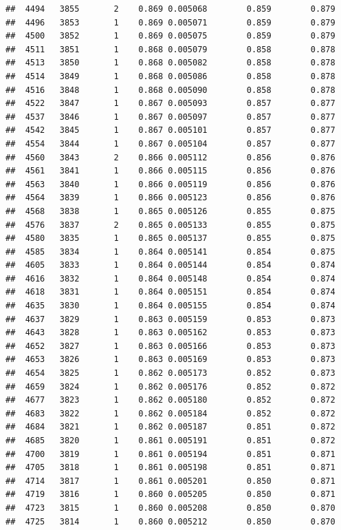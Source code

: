 \documentclass[
]{book}
\begin{document}
\begin{verbatim}
##  4494   3855       2    0.869 0.005068        0.859        0.879
##  4496   3853       1    0.869 0.005071        0.859        0.879
##  4500   3852       1    0.869 0.005075        0.859        0.879
##  4511   3851       1    0.868 0.005079        0.858        0.878
##  4513   3850       1    0.868 0.005082        0.858        0.878
##  4514   3849       1    0.868 0.005086        0.858        0.878
##  4516   3848       1    0.868 0.005090        0.858        0.878
##  4522   3847       1    0.867 0.005093        0.857        0.877
##  4537   3846       1    0.867 0.005097        0.857        0.877
##  4542   3845       1    0.867 0.005101        0.857        0.877
##  4554   3844       1    0.867 0.005104        0.857        0.877
##  4560   3843       2    0.866 0.005112        0.856        0.876
##  4561   3841       1    0.866 0.005115        0.856        0.876
##  4563   3840       1    0.866 0.005119        0.856        0.876
##  4564   3839       1    0.866 0.005123        0.856        0.876
##  4568   3838       1    0.865 0.005126        0.855        0.875
##  4576   3837       2    0.865 0.005133        0.855        0.875
##  4580   3835       1    0.865 0.005137        0.855        0.875
##  4585   3834       1    0.864 0.005141        0.854        0.875
##  4605   3833       1    0.864 0.005144        0.854        0.874
##  4616   3832       1    0.864 0.005148        0.854        0.874
##  4618   3831       1    0.864 0.005151        0.854        0.874
##  4635   3830       1    0.864 0.005155        0.854        0.874
##  4637   3829       1    0.863 0.005159        0.853        0.873
##  4643   3828       1    0.863 0.005162        0.853        0.873
##  4652   3827       1    0.863 0.005166        0.853        0.873
##  4653   3826       1    0.863 0.005169        0.853        0.873
##  4654   3825       1    0.862 0.005173        0.852        0.873
##  4659   3824       1    0.862 0.005176        0.852        0.872
##  4677   3823       1    0.862 0.005180        0.852        0.872
##  4683   3822       1    0.862 0.005184        0.852        0.872
##  4684   3821       1    0.862 0.005187        0.851        0.872
##  4685   3820       1    0.861 0.005191        0.851        0.872
##  4700   3819       1    0.861 0.005194        0.851        0.871
##  4705   3818       1    0.861 0.005198        0.851        0.871
##  4714   3817       1    0.861 0.005201        0.850        0.871
##  4719   3816       1    0.860 0.005205        0.850        0.871
##  4723   3815       1    0.860 0.005208        0.850        0.870
##  4725   3814       1    0.860 0.005212        0.850        0.870

\end{verbatim}
\end{document}
